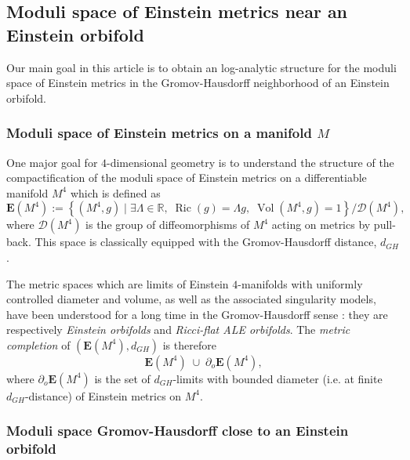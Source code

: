 \documentclass[12pt]{article}
\DeclareMathOperator{\vol}{\operatorname{Vol}}
\DeclareMathOperator{\Ric}{\operatorname{Ric}}
\begin{document}
\subsection{Moduli space of Einstein metrics near an Einstein orbifold}

Our main goal in this article is to obtain an log-analytic structure for the moduli space of Einstein metrics in the Gromov-Hausdorff neighborhood of an Einstein orbifold.

\subsubsection{Moduli space of Einstein metrics on a manifold $M$}

One major goal for $4$-dimensional geometry is to understand the structure of the compactification of the moduli space of Einstein metrics on a differentiable manifold $M^4$ which is defined as
\begin{equation}
    \mathbf{E}(M^4) := \left\{(M^4,g)\;|\;\exists \Lambda\in \mathbb{R},\; \Ric(g)=\Lambda g,\; \vol(M^4,g)= 1\right\}\slash\mathcal{D}(M^4),\label{def moduli space}
\end{equation}
where $\mathcal{D}(M^4)$ is the group of diffeomorphisms of $M^4$ acting on metrics by pull-back. This space is classically equipped with the Gromov-Hausdorff distance, $d_{GH}$. 

The metric spaces which are limits of Einstein $4$-manifolds with uniformly controlled diameter and volume, as well as the associated singularity models, have been understood for a long time in the Gromov-Hausdorff sense \cite{and,bkn}: they are respectively \emph{Einstein orbifolds} and \emph{Ricci-flat ALE orbifolds}. The \emph{metric completion} of $(\mathbf{E}(M^4),d_{GH})$ is therefore
\begin{equation}
    \mathbf{E}(M^4)\;\cup\;\partial_o\mathbf{E}(M^4),\label{def frontière}
\end{equation}
where $\partial_o\mathbf{E}(M^4)$ is the set of $d_{GH}$-limits with bounded diameter (i.e. at finite $d_{GH}$-distance) of Einstein metrics on $M^4$. 

\subsubsection{Moduli space Gromov-Hausdorff close to an Einstein orbifold}

\end{document}
